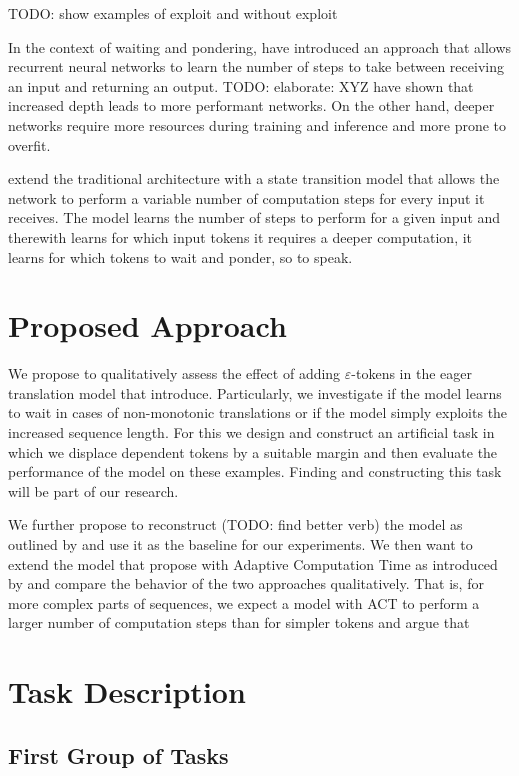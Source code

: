\documentclass[english]{uzhpub}
\begin{document}
TODO: show examples of exploit and without exploit

In the context of waiting and pondering, \cite{act.graves2016adaptive} have introduced an approach that allows recurrent neural networks to learn the number of steps to take between receiving an input and returning an output. TODO: elaborate: XYZ have shown that increased depth leads to more performant networks. On the other hand, deeper networks require more resources during training and inference and more prone to overfit.

\cite{act.graves2016adaptive} extend the traditional architecture with a state transition model that allows the network to perform a variable number of computation steps for every input it receives. The model learns the number of steps to perform for a given input and therewith learns for which input tokens it requires a deeper computation, it learns for which tokens to wait and ponder, so to speak.

\section{Proposed Approach}
We propose to qualitatively assess the effect of adding $\varepsilon$-tokens in the eager translation model that \cite{youmaynotneedattention} introduce. Particularly, we investigate if the model learns to wait in cases of non-monotonic translations or if the model simply exploits the increased sequence length. For this we design and construct an artificial task in which we displace dependent tokens by a suitable margin and then evaluate the performance of the model on these examples.
Finding and constructing this task will be part of our research.

We further propose to reconstruct (TODO: find better verb) the model as outlined by \cite{youmaynotneedattention} and use it as the baseline for our experiments. We then want to extend the model that \cite{youmaynotneedattention} propose with Adaptive Computation Time as introduced by \cite{act.graves2016adaptive} and compare the behavior of the two approaches qualitatively. That is, for more complex parts of sequences, we expect a model with ACT to perform a larger number of computation steps than for simpler tokens and argue that 


\section{Task Description}

\subsection{First Group of Tasks}
\end{document}
